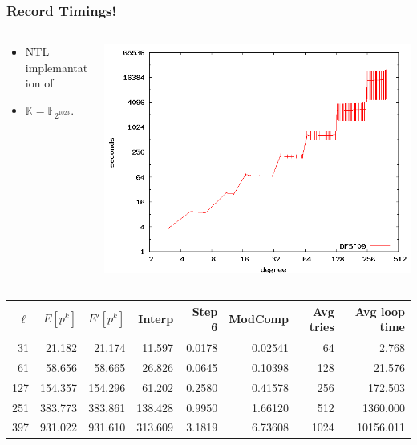 \documentclass[10pt]{beamer}
\newcommand{\K}{\mathbb{K}}  %
\newcommand{\F}{\mathbb{F}}  %
\newcommand{\0}{\mathcal{O}}  %
\begin{document}
\begin{frame}
  \frametitle{Record Timings!}

  
  \begin{columns}
    \begin{column}{0.4\textwidth}
      \begin{itemize}
      \item NTL implemantation of \cite{DFS09}
      \item $\K = \F_{2^{1023}}$.
      \end{itemize}
    \end{column}
    \begin{column}{0.6\textwidth}
      \includegraphics[width=\textwidth]{2-1023}

    \end{column}
  \end{columns}
  
  \smallskip
  \footnotesize
  \centering
  \begin{tabular}{r r r r r r r r}
    \hline
    $\ell$ & $E[p^k]$ & $E'[p^k]$ & Interp & Step 6 & ModComp & Avg tries & Avg loop time\\
    \hline
    31 & 21.182 & 21.174 & 11.597 & 0.0178 & 0.02541 & 64 & 2.768 \\
    61 & 58.656 & 58.665 & 26.826 & 0.0645 & 0.10398 & 128 & 21.576 \\
    127 & 154.357 & 154.296 & 61.202 & 0.2580 & 0.41578 & 256 & 172.503 \\
    251 & 383.773 & 383.861 & 138.428 & 0.9950 & 1.66120 & 512 & 1360.000 \\
    397 & 931.022 & 931.610 & 313.609 & 3.1819 & 6.73608 & 1024 & 10156.011 \\
    \hline
  \end{tabular}
\end{frame}
\end{document}
